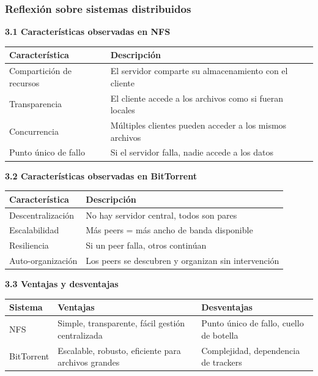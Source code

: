\documentclass[stu, 12pt, letterpaper, donotrepeattitle, floatsintext, noapacite]{apa7}
\begin{document}
\subsubsection{Reflexión sobre sistemas distribuidos}

\textbf{3.1 Características observadas en NFS}

\begin{table}[h]
\centering
\begin{tabular}{|p{4cm}|p{10cm}|}
\hline
\textbf{Característica} & \textbf{Descripción} \\ \hline
Compartición de recursos & El servidor comparte su almacenamiento con el cliente \\ \hline
Transparencia & El cliente accede a los archivos como si fueran locales \\ \hline
Concurrencia & Múltiples clientes pueden acceder a los mismos archivos \\ \hline
Punto único de fallo & Si el servidor falla, nadie accede a los datos \\ \hline
\end{tabular}
\end{table}

\textbf{3.2 Características observadas en BitTorrent}

\begin{table}[h]
\centering
\begin{tabular}{|p{4cm}|p{10cm}|}
\hline
\textbf{Característica} & \textbf{Descripción} \\ \hline
Descentralización & No hay servidor central, todos son pares \\ \hline
Escalabilidad & Más peers = más ancho de banda disponible \\ \hline
Resiliencia & Si un peer falla, otros continúan \\ \hline
Auto-organización & Los peers se descubren y organizan sin intervención \\ \hline
\end{tabular}
\end{table}

\textbf{3.3 Ventajas y desventajas}

\begin{table}[h]
\centering
\begin{tabular}{|p{3cm}|p{5cm}|p{6cm}|}
\hline
\textbf{Sistema} & \textbf{Ventajas} & \textbf{Desventajas} \\ \hline
NFS & Simple, transparente, fácil gestión centralizada & Punto único de fallo, cuello de botella \\ \hline
BitTorrent & Escalable, robusto, eficiente para archivos grandes & Complejidad, dependencia de trackers \\ \hline
\end{tabular}
\end{table}
\end{document}
